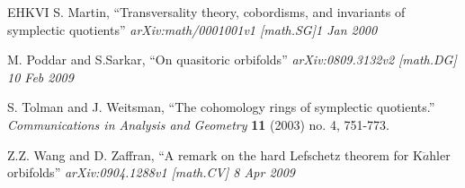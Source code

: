 \documentclass[12pt]{amsart}
\theoremstyle{definition}
\numberwithin{equation}{section}
\begin{document}
\begin{thebibliography}{EHKVI}
S. Martin, ``Transversality theory, cobordisms, and invariants of
symplectic quotients'' {\em arXiv:math/0001001v1 [math.SG]1 Jan
2000}

M. Poddar and S.Sarkar, ``On quasitoric orbifolds'' {\em
arXiv:0809.3132v2 [math.DG] 10 Feb 2009}

S. Tolman and J. Weitsman, ``The cohomology rings of symplectic
quotients.'' {\em Communications in Analysis and Geometry} {\bf 11}
(2003) no. 4, 751-773.

Z.Z. Wang and D. Zaffran, ``A remark on the hard Lefschetz theorem
for K$\ddot{a}$hler orbifolds'' {\em arXiv:0904.1288v1 [math.CV] 8
Apr 2009}
\end{thebibliography}
\end{document}
